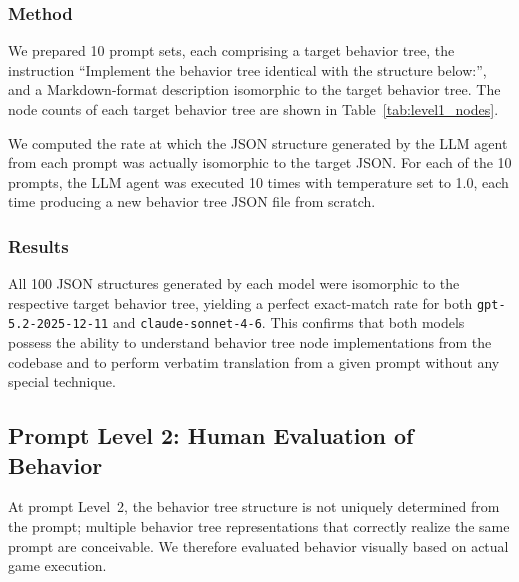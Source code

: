 \documentclass[conference]{IEEEtran}
\begin{document}
\subsubsection{Method}

\begin{table}[tbp]
    \centering
    \caption{Number of Nodes in Tasks Used in the Level~1 Experiment}
    \label{tab:level1_nodes}
\end{table}

We prepared 10 prompt sets, each comprising a target behavior tree, the instruction ``Implement the behavior tree identical with the structure below:'', and a Markdown-format description isomorphic to the target behavior tree. The node counts of each target behavior tree are shown in Table~\ref{tab:level1_nodes}.

We computed the rate at which the JSON structure generated by the LLM agent from each prompt was actually isomorphic to the target JSON. For each of the 10 prompts, the LLM agent was executed 10 times with temperature set to 1.0, each time producing a new behavior tree JSON file from scratch.

\subsubsection{Results}

All 100 JSON structures generated by each model were isomorphic to the respective target behavior tree, yielding a perfect exact-match rate for both \texttt{gpt-5.2-2025-12-11} and \texttt{claude-sonnet-4-6}. This confirms that both models possess the ability to understand behavior tree node implementations from the codebase and to perform verbatim translation from a given prompt without any special technique.

\subsection{Prompt Level 2: Human Evaluation of Behavior}

At prompt Level~2, the behavior tree structure is not uniquely determined from the prompt; multiple behavior tree representations that correctly realize the same prompt are conceivable. We therefore evaluated behavior visually based on actual game execution.
\end{document}
